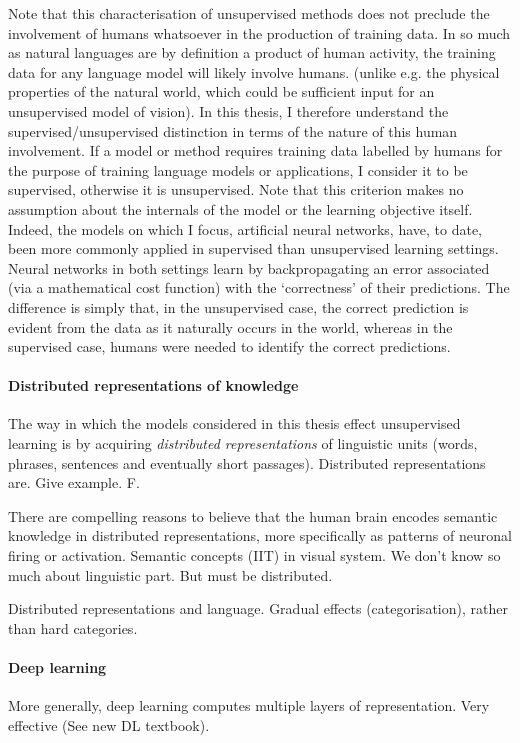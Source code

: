 Note that this characterisation of unsupervised methods does not preclude the involvement of humans whatsoever in the production of training data. In so much as natural languages are by definition a product of human activity, the training data for any language model will likely involve humans. (unlike e.g. the physical properties of the natural world, which could be sufficient input for an unsupervised model of vision). In this thesis, I therefore understand the supervised/unsupervised distinction in terms of the nature of this human involvement. If a model or method requires training data labelled by humans for the purpose of training language models or applications, I consider it to be supervised, otherwise it is unsupervised. Note that this criterion makes no assumption about the internals of the model or the learning objective itself. Indeed, the models on which I focus, artificial neural networks, have, to date, been more commonly applied in supervised than unsupervised learning settings. Neural networks in both settings learn by backpropagating an error associated (via a mathematical cost function) with the `correctness' of their predictions. The difference is simply that, in the unsupervised case, the correct prediction is evident from the data as it naturally occurs in the world, whereas in the supervised case, humans were needed to identify the correct predictions.  

\paragraph{Distributed representations of knowledge} The way in which the models considered in this thesis effect unsupervised learning is by acquiring \emph{distributed representations} of linguistic units (words, phrases, sentences and eventually short passages). Distributed representations are. Give example. F.  

There are compelling reasons to believe that the human brain encodes semantic knowledge in distributed representations, more specifically as patterns of neuronal firing or activation. Semantic concepts (IIT) in visual system. We don't know so much about linguistic part. But must be distributed. 

Distributed representations and language. Gradual effects (categorisation), rather than hard categories. 

\paragraph{Deep learning} More generally, deep learning computes multiple layers of representation. Very effective (See new DL textbook).

